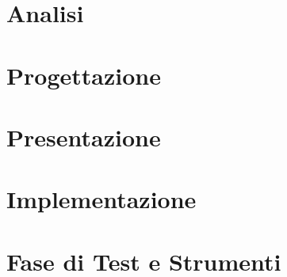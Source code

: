 \documentclass[a4paper, 12pt, dvipsnames, table]{article}
\begin{document}
\copertina

\newpage
\tableofcontents

\newpage


\newpage
\section{Analisi}



\newpage
\section{Progettazione}




\newpage
\section{Presentazione}




\newpage
\section{Implementazione}





\newpage


\newpage
\section{Fase di Test e Strumenti}




\newpage

\end{document}
